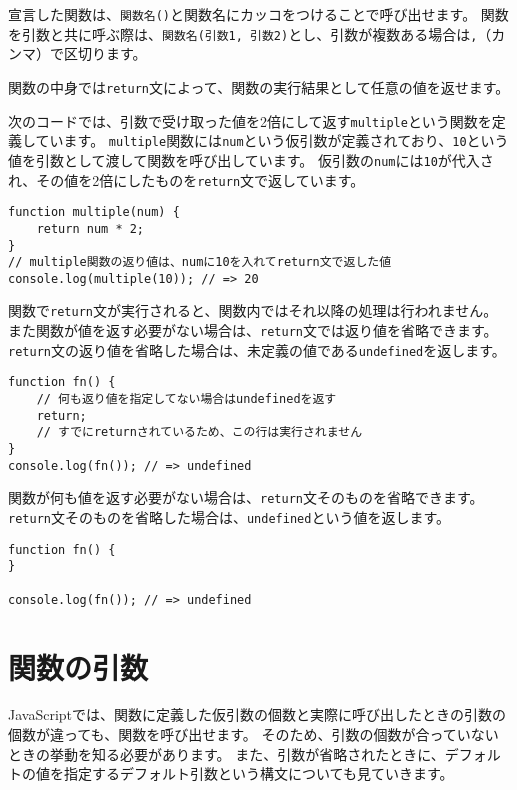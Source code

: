 宣言した関数は、\texttt{関数名()}と関数名にカッコをつけることで呼び出せます。
関数を引数と共に呼ぶ際は、\texttt{関数名(引数1, 引数2)}とし、引数が複数ある場合は\texttt{,}（カンマ）で区切ります。

関数の中身では\texttt{return}文によって、関数の実行結果として任意の値を返せます。

次のコードでは、引数で受け取った値を2倍にして返す\texttt{multiple}という関数を定義しています。
\texttt{multiple}関数には\texttt{num}という仮引数が定義されており、\texttt{10}という値を引数として渡して関数を呼び出しています。
仮引数の\texttt{num}には\texttt{10}が代入され、その値を2倍にしたものを\texttt{return}文で返しています。

\begin{lstlisting}
function multiple(num) {
    return num * 2;
}
// multiple関数の返り値は、numに10を入れてreturn文で返した値
console.log(multiple(10)); // => 20
\end{lstlisting}

関数で\texttt{return}文が実行されると、関数内ではそれ以降の処理は行われません。
また関数が値を返す必要がない場合は、\texttt{return}文では返り値を省略できます。
\texttt{return}文の返り値を省略した場合は、未定義の値である\texttt{undefined}を返します。

\begin{lstlisting}
function fn() {
    // 何も返り値を指定してない場合はundefinedを返す
    return;
    // すでにreturnされているため、この行は実行されません
}
console.log(fn()); // => undefined
\end{lstlisting}

関数が何も値を返す必要がない場合は、\texttt{return}文そのものを省略できます。
\texttt{return}文そのものを省略した場合は、\texttt{undefined}という値を返します。

\begin{lstlisting}
function fn() {
}

console.log(fn()); // => undefined
\end{lstlisting}

\hypertarget{function-arguments}{%
\section{関数の引数}\label{function-arguments}}

JavaScriptでは、関数に定義した仮引数の個数と実際に呼び出したときの引数の個数が違っても、関数を呼び出せます。
そのため、引数の個数が合っていないときの挙動を知る必要があります。
また、引数が省略されたときに、デフォルトの値を指定するデフォルト引数という構文についても見ていきます。

